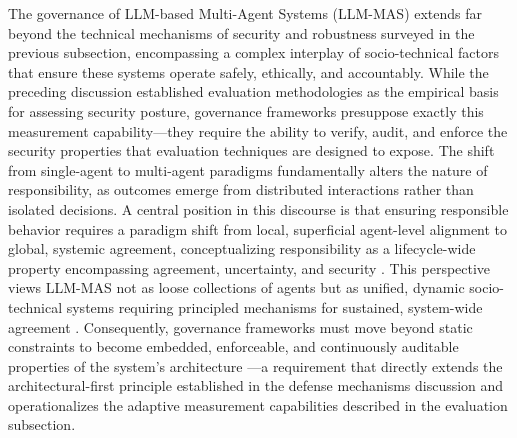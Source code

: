 \documentclass[11pt]{article}
\begin{document}
The governance of LLM-based Multi-Agent Systems (LLM-MAS) extends far beyond the technical mechanisms of security and robustness surveyed in the previous subsection, encompassing a complex interplay of socio-technical factors that ensure these systems operate safely, ethically, and accountably. While the preceding discussion established evaluation methodologies as the empirical basis for assessing security posture, governance frameworks presuppose exactly this measurement capability---they require the ability to verify, audit, and enforce the security properties that evaluation techniques are designed to expose. The shift from single-agent to multi-agent paradigms fundamentally alters the nature of responsibility, as outcomes emerge from distributed interactions rather than isolated decisions. A central position in this discourse is that ensuring responsible behavior requires a paradigm shift from local, superficial agent-level alignment to global, systemic agreement, conceptualizing responsibility as a lifecycle-wide property encompassing agreement, uncertainty, and security \cite{ref10}. This perspective views LLM-MAS not as loose collections of agents but as unified, dynamic socio-technical systems requiring principled mechanisms for sustained, system-wide agreement \cite{ref10}. Consequently, governance frameworks must move beyond static constraints to become embedded, enforceable, and continuously auditable properties of the system's architecture \cite{ref460}---a requirement that directly extends the architectural-first principle established in the defense mechanisms discussion and operationalizes the adaptive measurement capabilities described in the evaluation subsection.
\end{document}
